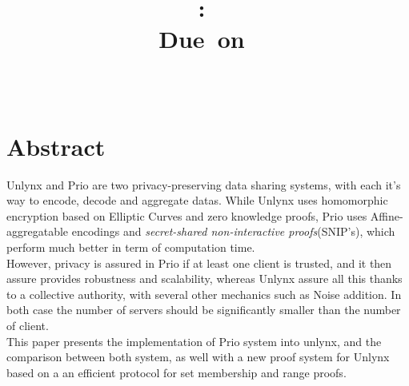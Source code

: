 \documentclass{article}
\title{
\logoepfl
\vspace{2in}
\textmd{\textbf{\hmwkClass:\ \hmwkTitle}}\\
\normalsize\vspace{0.1in}\small{Due\ on\ \hmwkDueDate}\\
\vspace{0.1in}\large{\textit{\hmwkClassInstructor\ \hmwkClassTime}}
\author{\textbf{\hmwkAuthorName}}
\vspace{3in}
}
\begin{document}
\maketitle

\newpage
\section*{Abstract}
Unlynx and Prio are two privacy-preserving data sharing systems, with each it's way to encode, decode and aggregate datas. While Unlynx uses homomorphic encryption based on Elliptic Curves and zero knowledge proofs, Prio uses Affine-aggregatable encodings and \textit{secret-shared non-interactive proofs}(SNIP's), which perform much better in term of computation time.\\
However, privacy is assured in Prio if at least one client is trusted, and it then assure provides robustness and scalability, whereas Unlynx assure all this thanks to a collective authority, with several other mechanics such as Noise addition. In both case the number of servers should be significantly smaller than the number of client.\\
This paper presents the implementation of Prio system into unlynx, and the comparison between both system, as well with a new proof system for Unlynx based on a an efficient protocol for set membership and range proofs.

\newpage
\tableofcontents
\newpage


\end{document}
